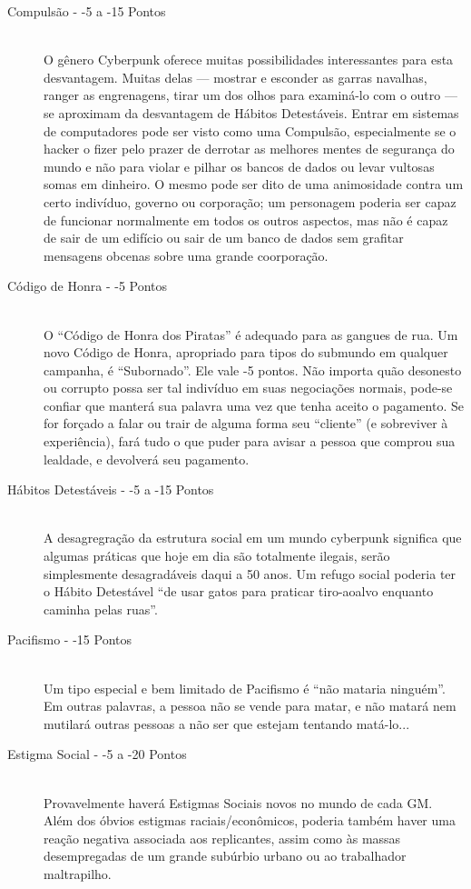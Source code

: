\documentclass[a4paper]{article}
\begin{document}
\begin{description}
    \item[Compulsão - -5 a -15 Pontos] \hfill \\ O gênero Cyberpunk oferece muitas possibilidades interessantes
para esta desvantagem. Muitas delas — mostrar e esconder as garras navalhas,
ranger as engrenagens, tirar um dos olhos para examiná-lo
com o outro — se aproximam da desvantagem de Hábitos Detestáveis.
Entrar em sistemas de computadores pode ser visto como uma
Compulsão, especialmente se o hacker o fizer pelo prazer de derrotar as
melhores mentes de segurança do mundo e não para violar e pilhar os
bancos de dados ou levar vultosas somas em dinheiro. O mesmo pode ser
dito de uma animosidade contra um certo indivíduo, governo ou corporação;
um personagem poderia ser capaz de funcionar normalmente em todos os
outros aspectos, mas não é capaz de sair de um edifício ou sair de um banco
de dados sem grafitar mensagens obcenas sobre uma grande coorporação.    

    \item[Código de Honra - -5 Pontos] \hfill \\  O “Código de Honra dos Piratas” é adequado para as gangues de rua.
Um novo Código de Honra, apropriado para tipos do submundo em
qualquer campanha, é “Subornado”. Ele vale -5 pontos. Não importa
quão desonesto ou corrupto possa ser tal indivíduo em suas negociações
normais, pode-se confiar que manterá sua palavra uma vez que tenha
aceito o pagamento. Se for forçado a falar ou trair de alguma forma seu
“cliente” (e sobreviver à experiência), fará tudo o que puder para avisar
a pessoa que comprou sua lealdade, e devolverá seu pagamento. 

    \item[Hábitos Detestáveis - -5 a -15 Pontos] \hfill \\ A desagregração da estrutura social em um mundo cyberpunk
significa que algumas práticas que hoje em dia são totalmente ilegais,
serão simplesmente desagradáveis daqui a 50 anos. Um refugo social
poderia ter o Hábito Detestável “de usar gatos para praticar tiro-aoalvo
enquanto caminha pelas ruas”.

    \item[Pacifismo - -15 Pontos] \hfill \\ Um tipo especial e bem limitado de Pacifismo é “não mataria
ninguém”. Em outras palavras, a pessoa não se vende para matar, e
não matará nem mutilará outras pessoas a não ser que estejam
tentando matá-lo...

    \item[Estigma Social - -5 a -20 Pontos] \hfill \\ Provavelmente haverá Estigmas Sociais novos no mundo de
cada GM. Além dos óbvios estigmas raciais/econômicos, poderia
também haver uma reação negativa associada aos replicantes, assim como às massas desempregadas de um grande subúrbio urbano ou ao trabalhador maltrapilho.


\end{description}
\end{document}
